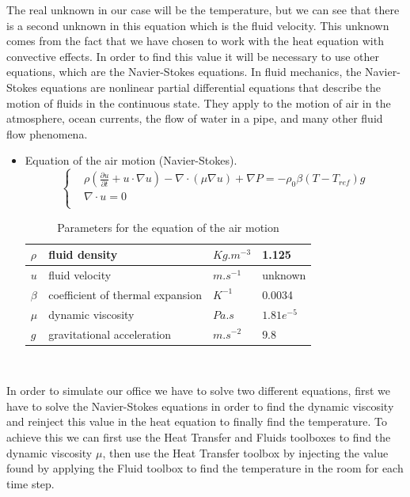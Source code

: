 \noindent The real unknown in our case will be the temperature, but we can see that there is a second unknown in this equation which is the fluid velocity. This unknown comes from the fact that we have chosen to work with the heat equation with convective effects. In order to find this value it will be necessary to use other equations, which are the Navier-Stokes equations.
\newline
\newline \noindent In fluid mechanics, the Navier-Stokes equations are nonlinear partial differential equations that describe the motion of fluids in the continuous state. They apply to the motion of air in the atmosphere, ocean currents, the flow of water in a pipe, and many other fluid flow phenomena. 
\begin{itemize}
\item Equation of the air motion (Navier-Stokes).
 $$\left\{\begin{aligned} 
        &\rho (\frac{\partial u}{\partial t}+u \cdot \nabla u)-\nabla \cdot (\mu \nabla u)+\nabla P =-\rho_0 \beta(T-T_{ref})g\\
        &\nabla \cdot u=0 \\
    \end{aligned}\right.$$
	\begin{table}[H]
\renewcommand{\arraystretch}{2}
\begin{tabular}{|R{3cm}|C{5cm}|L{3cm}|L{3cm}|}
\hline
$\rho$ & fluid density & $Kg.m^
{-3}$ & 1.125 \\[0.7cm]
\hline
$u$ & fluid velocity & $m.s^{-1}$ & unknown \\[0.7cm]
\hline
$\beta$ & coefficient of thermal expansion & $K^
{-1}$ &  0.0034 \\[0.7cm]
\hline
$\mu$ & dynamic viscosity & $Pa.s$ & $1.81e^{-5}$\\[0.7cm]
\hline
$g$ & gravitational acceleration & $m.s^{-2}$ & $9.8$\\[0.7cm]
\hline
\end{tabular}
\\[10pt]
\caption*{Parameters for the equation of the air motion}
\end{table}
\end{itemize}
\noindent 
In order to simulate our office we have to solve two different equations, first we have to solve the Navier-Stokes equations in order to find the dynamic viscosity and reinject this value in the heat equation to finally find the temperature. 
\newline \noindent To achieve this we can first use the Heat Transfer and Fluids toolboxes to find the dynamic viscosity $\mu$, then use the Heat Transfer toolbox by injecting the value found by applying the Fluid toolbox to find the temperature in the room for each time step.
